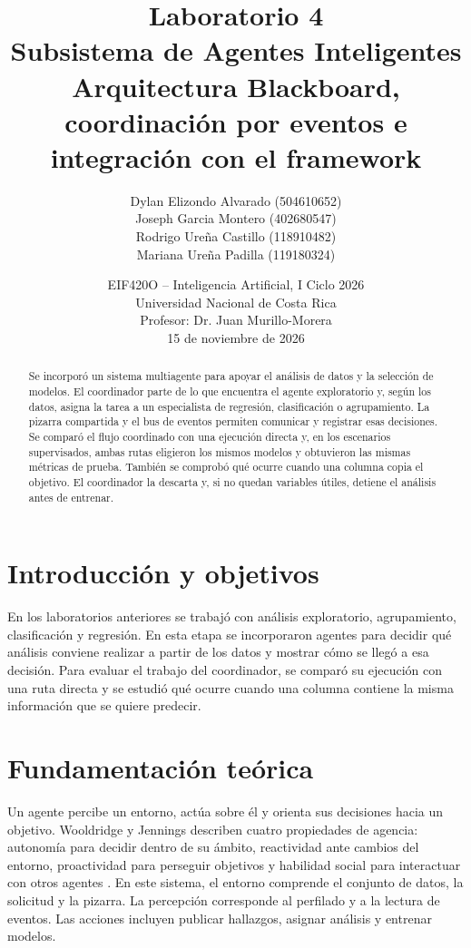 \documentclass[11pt]{article}
\title{\textbf{Laboratorio 4}\\[2pt] Subsistema de Agentes Inteligentes\\[2pt]\large Arquitectura Blackboard, coordinación por eventos e integración con el framework}
\author{Dylan Elizondo Alvarado (504610652)\\Joseph Garcia Montero (402680547)\\Rodrigo Ureña Castillo (118910482)\\Mariana Ureña Padilla (119180324)}
\date{EIF420O -- Inteligencia Artificial, I Ciclo 2026\\Universidad Nacional de Costa Rica\\Profesor: Dr. Juan Murillo-Morera\\15 de noviembre de 2026}
\begin{document}
\maketitle

\begin{abstract}
Se incorporó un sistema multiagente para apoyar el análisis de datos y la selección de modelos. El coordinador parte de lo que encuentra el agente exploratorio y, según los datos, asigna la tarea a un especialista de regresión, clasificación o agrupamiento. La pizarra compartida y el bus de eventos permiten comunicar y registrar esas decisiones. Se comparó el flujo coordinado con una ejecución directa y, en los escenarios supervisados, ambas rutas eligieron los mismos modelos y obtuvieron las mismas métricas de prueba. También se comprobó qué ocurre cuando una columna copia el objetivo. El coordinador la descarta y, si no quedan variables útiles, detiene el análisis antes de entrenar.
\end{abstract}

\tableofcontents
\clearpage

\section{Introducción y objetivos}

En los laboratorios anteriores se trabajó con análisis exploratorio, agrupamiento, clasificación y regresión. En esta etapa se incorporaron agentes para decidir qué análisis conviene realizar a partir de los datos y mostrar cómo se llegó a esa decisión. Para evaluar el trabajo del coordinador, se comparó su ejecución con una ruta directa y se estudió qué ocurre cuando una columna contiene la misma información que se quiere predecir.

\section{Fundamentación teórica}

Un agente percibe un entorno, actúa sobre él y orienta sus decisiones hacia un objetivo. Wooldridge y Jennings describen cuatro propiedades de agencia: autonomía para decidir dentro de su ámbito, reactividad ante cambios del entorno, proactividad para perseguir objetivos y habilidad social para interactuar con otros agentes \cite{wooldridge}. En este sistema, el entorno comprende el conjunto de datos, la solicitud y la pizarra. La percepción corresponde al perfilado y a la lectura de eventos. Las acciones incluyen publicar hallazgos, asignar análisis y entrenar modelos.
\end{document}
